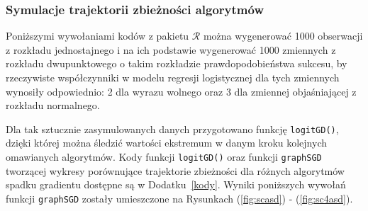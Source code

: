 \newpage
\subsubsection{Symulacje trajektorii zbieżności algorytmów}
Poniższymi wywołaniami kodów z pakietu $\mathcal{R}$ \cite{programikr} można wygenerować 1000 obserwacji z rozkładu jednostajnego i na ich podstawie wygenerować 1000 zmiennych z rozkładu dwupunktowego o takim rozkładzie prawdopodobieństwa sukcesu, by rzeczywiste współczynniki w modelu regresji logistycznej dla tych zmiennych wynosiły odpowiednio: 2 dla wyrazu wolnego oraz 3 dla zmiennej objaśniającej z rozkładu normalnego. 
\begin{Shaded}
\begin{Highlighting}[]
\StringTok{ }\NormalTok{(}\NormalTok{)}
\StringTok{ } \NormalTok{+}\StringTok{ }
\StringTok{ }\NormalTok{/(}\NormalTok{+}
\StringTok{ }\NormalTok{(}\NormalTok{,}
\end{Highlighting}
\end{Shaded}

Dla tak sztucznie zasymulowanych danych przygotowano funkcję \texttt{logitGD()}, dzięki której można śledzić wartości ekstremum w danym kroku kolejnych omawianych algorytmów. Kody funkcji \texttt{logitGD()} oraz funkcji \texttt{graphSGD} tworzącej wykresy porównujące trajektorie zbieżności dla różnych algorytmów spadku gradientu  dostępne są w Dodatku~\ref{kody}. Wyniki poniższych wywołań funkcji \texttt{graphSGD} zostały umieszczone na Rysunkach (\ref{fig:scasd}) - (\ref{fig:sc4asd}).

\begin{Shaded}
\begin{Highlighting}[]
\NormalTok{(}\NormalTok{(}\NormalTok{,}\NormalTok{);}\NormalTok{(}\NormalTok{(}\NormalTok{,}\NormalTok{)}
\NormalTok{(}\NormalTok{(}\NormalTok{,}\NormalTok{);}\NormalTok{(}\NormalTok{(}\NormalTok{,}\NormalTok{)}
\NormalTok{(}\NormalTok{(}\NormalTok{,}\NormalTok{);}\NormalTok{(}\NormalTok{(}\NormalTok{,}\NormalTok{)}
\NormalTok{(}\NormalTok{(}\NormalTok{,}\NormalTok{);}\NormalTok{(}\NormalTok{(}\NormalTok{,}\NormalTok{)}
\end{Highlighting}
\end{Shaded}

